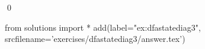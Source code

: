 
\begin{ex} 
  \label{ex:dfastatediag3}
  
  \qed
\end{ex} 
\begin{python0}
from solutions import *
add(label="ex:dfastatediag3",
    srcfilename='exercises/dfastatediag3/answer.tex') 
\end{python0}
